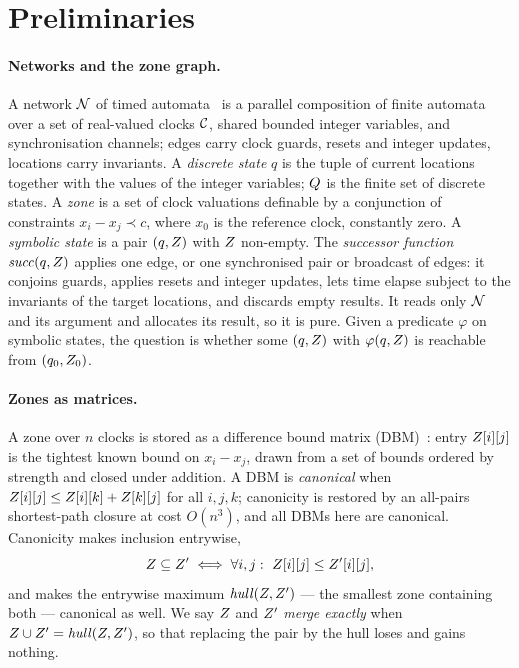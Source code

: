 \section{Preliminaries}\label{sec:prelim}

\paragraph{Networks and the zone graph.}
A network $\mathcal{N}$ of timed automata~\cite{AlurDill94} is a parallel composition of
finite automata over a set of real-valued clocks $\mathcal{C}$, shared bounded
integer variables, and synchronisation channels; edges carry clock guards, resets
and integer updates, locations carry invariants.  A \emph{discrete state} $q$ is
the tuple of current locations together with the values of the integer variables;
$Q$ is the finite set of discrete states.  A \emph{zone} is a set of clock
valuations definable by a conjunction of constraints $x_i - x_j \prec c$, where
$x_0$ is the reference clock, constantly zero.  A \emph{symbolic state} is a pair
$(q,Z)$ with $Z$ non-empty.  The \emph{successor function}
$\mathit{succ}(q,Z)$ applies one edge, or one synchronised pair or broadcast of
edges: it conjoins guards, applies resets and integer updates, lets time elapse
subject to the invariants of the target locations, and discards empty results.
It reads only $\mathcal{N}$ and its argument and allocates its result, so it is pure.
Given a predicate $\varphi$ on symbolic states, the question is whether some
$(q,Z)$ with $\varphi(q,Z)$ is reachable from $(q_0,Z_0)$.

\paragraph{Zones as matrices.}
A zone over $n$ clocks is stored as a difference bound matrix
(DBM)~\cite{Dill89,Bengtsson04}: entry $Z[i][j]$ is the tightest known bound
on $x_i - x_j$, drawn from a set of bounds ordered by strength and closed under
addition.  A DBM is \emph{canonical} when $Z[i][j] \le Z[i][k] +
Z[k][j]$ for all $i,j,k$; canonicity is restored by an all-pairs
shortest-path closure at cost $O(n^3)$, and all DBMs here are canonical.
Canonicity makes inclusion entrywise,
\begin{equation}\label{eq:denseincl}
  Z \subseteq Z' \iff \forall i,j:\ Z[i][j] \le Z'[i][j],
\end{equation}
and makes the entrywise maximum $\mathit{hull}(Z,Z')$ --- the smallest zone
containing both --- canonical as well.  We say $Z$ and $Z'$ \emph{merge
exactly} when $Z \cup Z' = \mathit{hull}(Z,Z')$, so that replacing the
pair by the hull loses and gains nothing.

